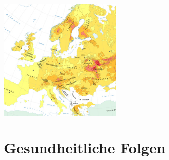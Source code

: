 \documentclass{beamer}
\begin{document}
\begin{frame}{}
    \begin{center}
        \includegraphics[height=6.0cm]{img/Kontaminierte_gebiete_3.jpg}\\
        \begin{block}{}
        \end{block}
    \end{center}
\end{frame}

\section{Gesundheitliche Folgen}

\begin{frame}
    \begin{columns}
    \end{columns}
    \begin{block}{}
    \end{block}
\end{frame}
\end{document}

